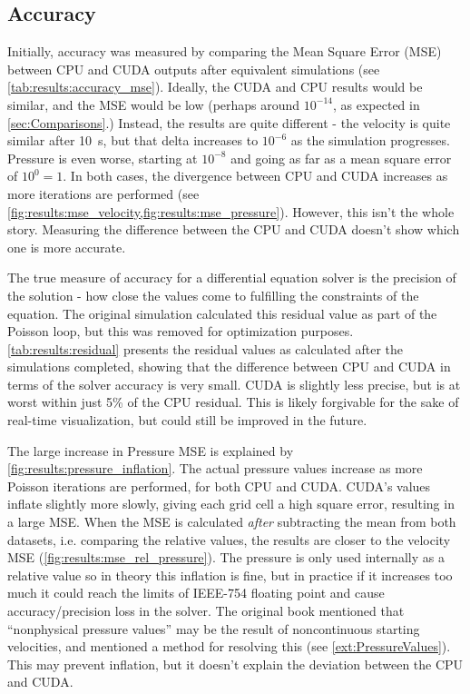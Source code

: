 \subsection{Accuracy}\label{sec:Results:Sim:Accuracy}

Initially, accuracy was measured by comparing the Mean Square Error (MSE) between CPU and CUDA outputs after equivalent simulations (see \cref{tab:results:accuracy_mse}).
Ideally, the CUDA and CPU results would be similar, and the MSE would be low (perhaps around $10^{-14}$, as expected in \cref{sec:Comparisons}.)
Instead, the results are quite different - the velocity is quite similar after \SI{10}{\second}, but that delta increases to $10^{-6}$ as the simulation progresses.
Pressure is even worse, starting at $10^{-8}$ and going as far as a mean square error of $10^{0} = 1$.
In both cases, the divergence between CPU and CUDA increases as more iterations are performed (see \cref{fig:results:mse_velocity,fig:results:mse_pressure}).
However, this isn't the whole story.
Measuring the difference between the CPU and CUDA doesn't show which one is more accurate.





The true measure of accuracy for a differential equation solver is the precision of the solution - how close the values come to fulfilling the constraints of the equation.
The original simulation calculated this residual value as part of the Poisson loop, but this was removed for optimization purposes.
\cref{tab:results:residual} presents the residual values as calculated after the simulations completed, showing that the difference between CPU and CUDA in terms of the solver accuracy is very small.
CUDA is slightly less precise, but is at worst within just 5\% of the CPU residual.
This is likely forgivable for the sake of real-time visualization, but could still be improved in the future.




The large increase in Pressure MSE is explained by \cref{fig:results:pressure_inflation}.
The actual pressure values increase as more Poisson iterations are performed, for both CPU and CUDA.
CUDA's values inflate slightly more slowly, giving each grid cell a high square error, resulting in a large MSE.
When the MSE is calculated \emph{after} subtracting the mean from both datasets, i.e. comparing the relative values, the results are closer to the velocity MSE (\cref{fig:results:mse_rel_pressure}).
The pressure is only used internally as a relative value so in theory this inflation is fine, but in practice if it increases too much it could reach the limits of IEEE-754 floating point\cite{IEEEFloat75419} and cause accuracy/precision loss in the solver.
The original book mentioned that ``nonphysical pressure values'' may be the result of noncontinuous starting velocities\cite{book:griebel1998numerical}, and mentioned a method for resolving this (see \cref{ext:PressureValues}). This may prevent inflation, but it doesn't explain the deviation between the CPU and CUDA.

